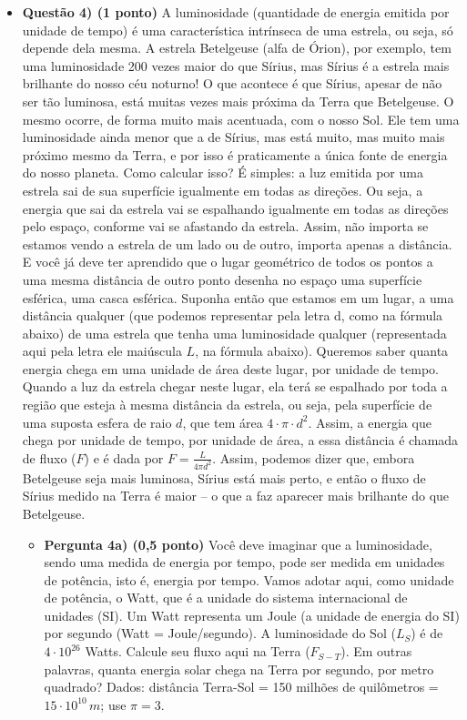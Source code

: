 \documentclass[a4paper, 12pt]{article}
\begin{document}
\begin{flushleft}
\begin{itemize}
            \item \textbf{Questão 4) (1 ponto)} A luminosidade (quantidade de energia emitida por unidade de tempo) é uma característica intrínseca de uma estrela, ou seja, só depende dela mesma. A estrela Betelgeuse (alfa de Órion), por exemplo, tem uma luminosidade 200 vezes maior do que Sírius, mas Sírius é a estrela mais brilhante do nosso céu noturno! O que acontece é que Sírius, apesar de não ser tão luminosa, está muitas vezes mais próxima da Terra que Betelgeuse. O mesmo ocorre, de forma muito mais acentuada, com o nosso Sol. Ele tem uma luminosidade ainda menor que a de Sírius, mas está muito, mas muito mais próximo mesmo da Terra, e por isso é praticamente a única fonte de energia do nosso planeta. Como calcular isso? É simples: a luz emitida por uma estrela sai de sua superfície igualmente em todas as direções. Ou seja, a energia que sai da estrela vai se espalhando igualmente em todas as direções pelo espaço, conforme vai se afastando da estrela. Assim, não importa se estamos vendo a estrela de um lado ou de outro, importa apenas a distância. E você já deve ter aprendido que o lugar geométrico de todos os pontos a uma mesma distância de outro ponto desenha no espaço uma superfície esférica, uma casca esférica. Suponha então que estamos em um lugar, a uma distância qualquer (que podemos representar pela letra d, como na fórmula abaixo) de uma estrela que tenha uma luminosidade qualquer (representada aqui pela letra ele maiúscula $L$, na fórmula abaixo). Queremos saber quanta energia chega em uma unidade de área deste lugar, por unidade de tempo. Quando a luz da estrela chegar neste lugar, ela terá se espalhado por toda a região que esteja à mesma distância da estrela, ou seja, pela superfície de uma suposta esfera de raio $d$, que tem área $4 \cdot \pi \cdot d^2$. Assim, a energia que chega por unidade de tempo, por unidade de área, a essa distância é chamada de fluxo ($F$) e é dada por $F = \frac{L}{4 \pi d^2}$. Assim, podemos dizer que, embora Betelgeuse seja mais luminosa, Sírius está mais perto, e então o fluxo de Sírius medido na Terra é maior -- o que a faz aparecer mais brilhante do que Betelgeuse.
                \begin{itemize}
                    \item \textbf{Pergunta 4a) (0,5 ponto)} Você deve imaginar que a luminosidade, sendo uma medida de energia por tempo, pode ser medida em unidades de potência, isto é, energia por tempo. Vamos adotar aqui, como unidade de potência, o Watt, que é a unidade do sistema internacional de unidades (SI). Um Watt representa um Joule (a unidade de energia do SI) por segundo (Watt = Joule/segundo). A luminosidade do Sol ($L_S$) é de $4 \cdot 10^{26}$ Watts. Calcule seu fluxo aqui na Terra ($F_{S-T}$). Em outras palavras, quanta energia solar chega na Terra por segundo, por metro quadrado? Dados: distância Terra-Sol = 150 milhões de quilômetros = $15 \cdot 10^{10} \, m$; use $\pi = 3$.

\end{itemize}
\end{itemize}
\end{flushleft}
\end{document}
